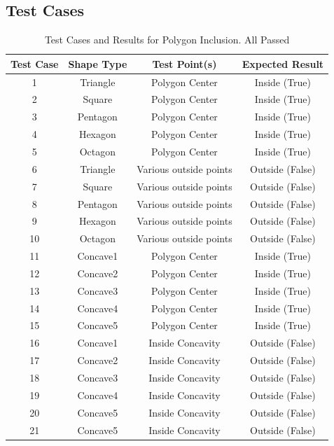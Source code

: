 \documentclass{labReport}
\begin{document}
\begin{multicols*}{2}
\section{Test Cases}
\begin{table}[h!]
\centering
\begin{tabular}{|c|c|c|c|}
\hline
\textbf{Test Case} & \textbf{Shape Type} & \textbf{Test Point(s)} & \textbf{Expected Result} \\ \hline
1 & Triangle      & Polygon Center  & Inside (True) \\ \hline
2 & Square        & Polygon Center      & Inside (True) \\ \hline
3 & Pentagon      & Polygon Center      & Inside (True) \\ \hline
4 & Hexagon       & Polygon Center      & Inside (True) \\ \hline
5 & Octagon       & Polygon Center      & Inside (True) \\ \hline
6 & Triangle      & Various outside points & Outside (False) \\ \hline
7 & Square        & Various outside points & Outside (False) \\ \hline
8 & Pentagon      & Various outside points & Outside (False) \\ \hline
9 & Hexagon       & Various outside points & Outside (False) \\ \hline
10 & Octagon      & Various outside points & Outside (False) \\ \hline
11 & Concave1     & Polygon Center        & Inside (True) \\ \hline
12 & Concave2     & Polygon Center        & Inside (True) \\ \hline
13 & Concave3     & Polygon Center        & Inside (True) \\ \hline
14 & Concave4     & Polygon Center        & Inside (True) \\ \hline
15 & Concave5     & Polygon Center        & Inside (True) \\ \hline
16 & Concave1     & Inside Concavity      & Outside (False) \\ \hline
17 & Concave2     & Inside Concavity      & Outside (False) \\ \hline
18 & Concave3     & Inside Concavity      & Outside (False) \\ \hline
19 & Concave4     & Inside Concavity      & Outside (False) \\ \hline
20 & Concave5     & Inside Concavity      & Outside (False) \\ \hline
21 & Concave5     & Inside Concavity      & Outside (False) \\ \hline
\end{tabular}
\caption{Test Cases and Results for Polygon Inclusion. All Passed}
\label{tab:test_cases}
\end{table}
    



\end{multicols*}
\end{document}
